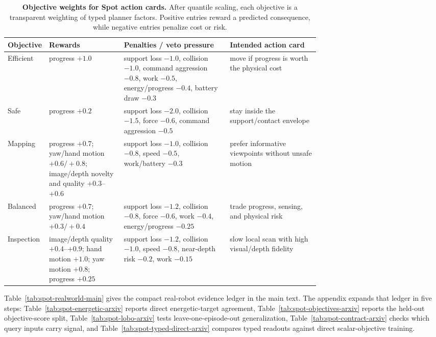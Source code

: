 \begin{table}[H]
\centering
\scriptsize
\caption{\textbf{Objective weights for Spot action cards.}
After quantile scaling, each objective is a transparent weighting of typed planner factors.
Positive entries reward a predicted consequence, while negative entries penalize cost or risk.}
\label{tab:spot-objective-weights-arxiv}
\setlength{\tabcolsep}{3pt}
\renewcommand{\arraystretch}{1.12}
\begin{tabularx}{\linewidth}{@{}>{\raggedright\arraybackslash}p{0.13\linewidth}>{\raggedright\arraybackslash}p{0.24\linewidth}>{\raggedright\arraybackslash}p{0.34\linewidth}>{\raggedright\arraybackslash}X@{}}
\toprule
\textbf{Objective} & \textbf{Rewards} & \textbf{Penalties / veto pressure} & \textbf{Intended action card} \\
\midrule
Efficient &
progress $+1.0$ &
support loss $-1.0$, collision $-1.0$, command aggression $-0.8$, work $-0.5$, energy/progress $-0.4$, battery draw $-0.3$ &
move if progress is worth the physical cost \\
Safe &
progress $+0.2$ &
support loss $-2.0$, collision $-1.5$, force $-0.6$, command aggression $-0.5$ &
stay inside the support/contact envelope \\
Mapping &
progress $+0.7$; yaw/hand motion $+0.6/+0.8$; image/depth novelty and quality $+0.3$--$+0.6$ &
support loss $-1.0$, collision $-0.8$, speed $-0.5$, work/battery $-0.3$ &
prefer informative viewpoints without unsafe motion \\
Balanced &
progress $+0.7$; yaw/hand motion $+0.3/+0.4$ &
support loss $-1.2$, collision $-0.8$, force $-0.6$, work $-0.4$, energy/progress $-0.25$ &
trade progress, sensing, and physical risk \\
Inspection &
image/depth quality $+0.4$--$+0.9$; hand motion $+1.0$; yaw motion $+0.8$; progress $+0.25$ &
support loss $-1.2$, collision $-1.0$, speed $-0.8$, near-depth risk $-0.2$, work $-0.15$ &
slow local scan with high visual/depth fidelity \\
\bottomrule
\end{tabularx}
\end{table}

Table~\ref{tab:spot-realworld-main} gives the compact real-robot evidence ledger in the main text.
The appendix expands that ledger in five steps: Table~\ref{tab:spot-energetic-arxiv} reports direct energetic-target agreement, Table~\ref{tab:spot-objectives-arxiv} reports the held-out objective-score split, Table~\ref{tab:spot-lobo-arxiv} tests leave-one-episode-out generalization, Table~\ref{tab:spot-contract-arxiv} checks which query inputs carry signal, and Table~\ref{tab:spot-typed-direct-arxiv} compares typed readouts against direct scalar-objective training.

